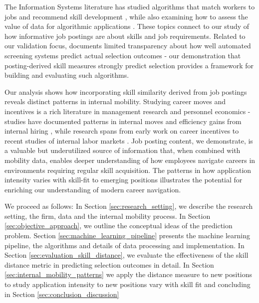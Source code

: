 \documentclass[12pt]{article}
\begin{document}
The Information Systems literature has studied algorithms that match workers to jobs and recommend skill development \parencite{kokkodis2021demand, kokkodis2023good}, while also examining how to assess the value of data for algorithmic applications \parencite{lei2024value}. These topics connect to our study of how informative job postings are about skills and job requirements. Related to our validation focus, \parencite{raghavan2020mitigating} documents limited transparency about how well automated screening systems predict actual selection outcomes - our demonstration that posting-derived skill measures strongly predict selection provides a framework for building and evaluating such algorithms.

Our analysis shows how incorporating skill similarity derived from job postings reveals distinct patterns in internal mobility. Studying career moves and incentives is a rich literature in management research and personnel economics - studies have documented patterns in internal moves \parencite{bidwell2024stepping} and efficiency gains from internal hiring \parencite{bidwell2011paying}, while research spans from early work on career incentives \parencite{baker1994internal, baker1994wage} to recent studies of internal labor markets \parencite{tambe2020paying, huitfeldt2023internal}. Job posting content, we demonstrate, is a valuable but underutilized source of information that, when combined with mobility data, enables deeper understanding of how employees navigate careers in environments requiring regular skill acquisition. The patterns in how application intensity varies with skill-fit to emerging positions illustrates the potential for enriching our understanding of modern career navigation.


We proceed as follows: In Section \ref{sec:research_setting}, we describe the research setting, the firm, data and the internal mobility process. In Section \ref{sec:objective_approach}, we outline the conceptual ideas of the prediction problem. Section \ref{sec:machine_learning_pipeline} presents the machine learning pipeline, the algorithms and details of data processing and implementation. In Section \ref{sec:evaluation_skill_distance}, we evaluate the effectiveness of the skill distance metric in predicting selection outcomes in detail. In Section \ref{sec:internal_mobility_patterns} we apply the distance measure to new positions to study application intensity to new positions vary with skill fit and concluding in Section \ref{sec:conclusion_discussion}
\end{document}

